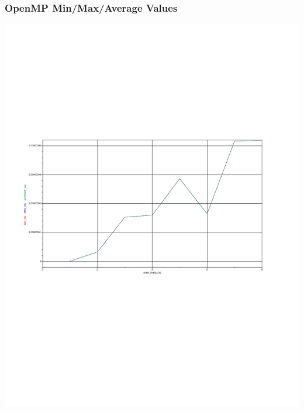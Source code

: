 \documentclass{article}
\begin{document}
\subsubsection*{OpenMP Min/Max/Average Values}
\includegraphics[scale=0.5]{images/omp_vals.pdf}
\end{document}
